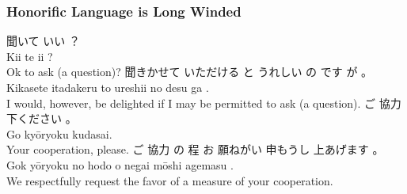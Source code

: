 \documentclass[xetex]{beamer}
\begin{document}
\begin{frame}
\frametitle{Honorific Language is Long Winded}
\begin{exe}
    \ex \gll 聞いて いい ？ \\
             Kii te ii ? \\
             \trans Ok to ask (a question)?
\gll 聞きかせて いただける と うれしい の です が 。 \\
      Kikasete itadakeru to ureshii no desu ga . \\

      \trans I would, however, be delighted if I may be permitted to ask (a question). 
\ex \gll ご 協力 下ください 。\\
         Go kyōryoku kudasai. \\
\trans Your cooperation, please.
\gll ご 協力 の 程 お 願ねがい 申もうし 上あげます 。 \\
     Gok yōryoku no hodo o negai mōshi agemasu . \\
\trans We respectfully request the favor of a measure of your cooperation.
\end{exe}
\end{frame}
\end{document}
